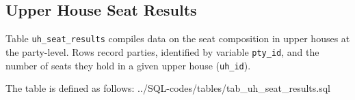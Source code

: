 \subsection{Upper House Seat Results}\label{subsec_tab_uh_seat_results}

Table  \texttt{uh\_seat\_results} compiles data on the seat composition in upper houses at the party-level. 
Rows record parties, identified by variable \texttt{pty\_id}, and the number of seats they hold in a given upper house (\texttt{uh\_id}).


The table is defined as follows: 
%
{../SQL-codes/tables/tab_uh_seat_results.sql}

